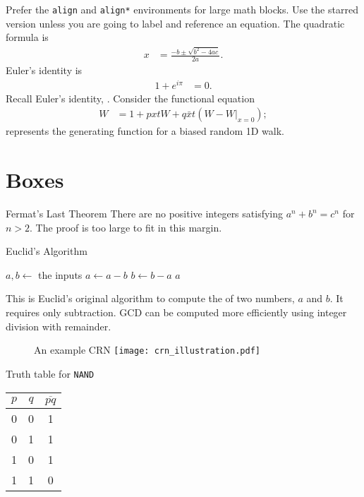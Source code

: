 Prefer the \verb|align| and \verb|align*| environments for large math blocks.
Use the starred version unless you are going to label and reference an equation.
The quadratic formula is
\begin{align*}
    x &= \frac{-b \pm \sqrt{b^2-4ac}}{2a}.
\end{align*}
Euler's identity is
\begin{align}
    1 + e^{i\pi} &= 0.
    \label{eqn:tut:euler}
\end{align}
Recall Euler's identity, .
Consider the functional equation
\begin{align}
    \tag{$\ast$}
    W &= 1 + pxtW + q\bar x t(W - W|_{x=0});
    \label{eqn:tut:func}
\end{align}
 represents the generating function for a biased random 1D walk.

\section{Boxes}

\begin{theorem}{Fermat's Last Theorem}
  There are no positive integers satisfying $a^n + b^n = c^n$ for $n>2$.
\proof
  The proof is too large to fit in this margin.
\end{theorem}

\begin{breakout}[label=box:tut:gcd]{Euclid's Algorithm}
  \begin{algorithmic}
    \State $a,b \gets$ the inputs
        \State $a \gets a - b$ 
      \Else
        \State $b \gets b - a$
      \EndIf
    \EndWhile
    \State \Return $a$
  \end{algorithmic}
\tcblower
  This is Euclid's original algorithm to compute the  of two numbers, $a$ and $b$.
  It requires only subtraction.
  GCD can be computed more efficiently using integer division with remainder.
\end{breakout}

\begin{figure}[label=fig:tut:myfigure,credit={Credit: Anastasia Ershova}]{An example CRN}
  \texttt{[image: crn\_illustration.pdf]}
\end{figure}

\begin{table}[label=tbl:tut:mytable]{Truth table for \texttt{NAND}}
  \begin{tabular}{cc|c}
    $p$ & $q$ & $\overline{pq}$ \\ \hline
    0 & 0 & 1 \\
    0 & 1 & 1 \\
    1 & 0 & 1 \\
    1 & 1 & 0 \\
  \end{tabular}
\end{table}


